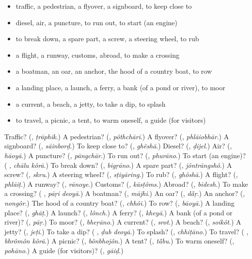 \begin{itemize}
\raggedright
  \item traffic, a pedestrian, a flyover, a signboard, to keep close to
  \item diesel, air, a puncture, to run out, to start (an engine)
  \item to break down, a spare part, a screw, a steering wheel, to rub
  \item a flight, a runway, customs, abroad, to make a crossing
  \item a boatman, an oar, an anchor, the hood of a country boat, to row
  \item a landing place, a launch, a ferry, a bank (of a pond or river), to moor
  \item a current, a beach, a jetty, to take a dip, to splash
  \item to travel, a picnic, a tent, to warm oneself, a guide (for visitors)
\end{itemize}

\begin{tcolorbox}[breakable,colback=teal!4,colframe=teal!35!black,title={Before you move on}]
Traffic? (\textbf{}, \emph{ṭrāphik}.) A pedestrian? (\textbf{}, \emph{pôthchārī}.) A flyover? (\textbf{}, \emph{phlāiobhār}.) A signboard? (\textbf{}, \emph{sāinborḍ}.) To keep close to? (\textbf{}, \emph{ghẽshā}.) Diesel? (\textbf{}, \emph{ḍijel}.) Air? (\textbf{}, \emph{hāoyā}.) A puncture? (\textbf{}, \emph{pāngchār}.) To run out? (\textbf{}, \emph{phurāno}.) To start (an engine)? (\textbf{ }, \emph{chālu kôrā}.) To break down? (\textbf{}, \emph{bigṛāno}.) A spare part? (\textbf{}, \emph{jôntrāngshô}.) A screw? (\textbf{}, \emph{skru}.) A steering wheel? (\textbf{}, \emph{sṭiyāring}.) To rub? (\textbf{}, \emph{ghôshā}.) A flight? (\textbf{}, \emph{phlāiṭ}.) A runway? (\textbf{}, \emph{rānoye}.) Customs? (\textbf{}, \emph{kāsṭôms}.) Abroad? (\textbf{}, \emph{bidesh}.) To make a crossing? (\textbf{ }, \emph{pāṛi deoyā}.) A boatman? (\textbf{}, \emph{mājhi}.) An oar? (\textbf{}, \emph{dā̃ṛ}.) An anchor? (\textbf{}, \emph{nongôr}.) The hood of a country boat? (\textbf{}, \emph{chhôi}.) To row? (\textbf{}, \emph{bāoyā}.) A landing place? (\textbf{}, \emph{ghāṭ}.) A launch? (\textbf{}, \emph{lônch}.) A ferry? (\textbf{}, \emph{kheyā}.) A bank (of a pond or river)? (\textbf{}, \emph{pāṛ}.) To moor? (\textbf{}, \emph{bheṛāno}.) A current? (\textbf{}, \emph{srot}.) A beach? (\textbf{}, \emph{soikôt}.) A jetty? (\textbf{}, \emph{jeṭi}.) To take a dip? (\textbf{ }, \emph{ḍub deoyā}.) To splash? (\textbf{}, \emph{chhiṭāno}.) To travel? (\textbf{ }, \emph{bhrômôn kôrā}.) A picnic? (\textbf{}, \emph{bônbhojôn}.) A tent? (\textbf{}, \emph{tā̃bu}.) To warm oneself? (\textbf{}, \emph{pohāno}.) A guide (for visitors)? (\textbf{}, \emph{gāiḍ}.)
\end{tcolorbox}
